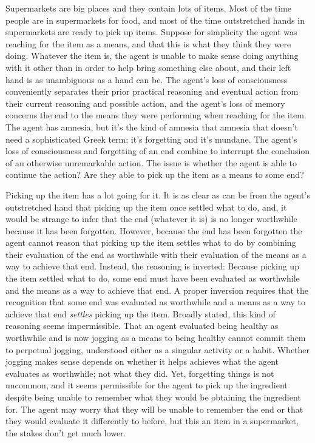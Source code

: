 \documentclass[10pt]{article}
\newcommand{\hozlinedash}[0]{%
  \noindent\hdashrule[0.5ex][c]{\textwidth}{.1pt}{2.5pt}
}
\begin{document}
\hozlinedash

Supermarkets are big places and they contain lots of items.
Most of the time people are in supermarkets for food, and most of the time outstretched hands in supermarkets are ready to pick up items.
Suppose for simplicity the agent was reaching for the item as a means, and that this is what they think they were doing.
Whatever the item is, the agent is unable to make sense doing anything with it other than in order to help bring something else about, and their left hand is as unambiguous as a hand can be.
The agent's loss of consciousness conveniently separates their prior practical reasoning and eventual action from their current reasoning and possible action, and the agent's loss of memory concerns the end to the means they were performing when reaching for the item.
The agent has amnesia, but it's the kind of amnesia that amnesia that doesn't need a sophisticated Greek term; it's forgetting and it's mundane.
The agent's loss of consciousness and forgetting of an end combine to interrupt the conclusion of an otherwise unremarkable action.
The issue is whether the agent is able to continue the action?
Are they able to pick up the item as a means to some end?

Picking up the item has a lot going for it.
It is as clear as can be from the agent's outstretched hand that picking up the item once settled what to do, and, it would be strange to infer that the end (whatever it is) is no longer worthwhile because it has been forgotten.
However, because the end has been forgotten the agent cannot reason that picking up the item settles what to do by combining their evaluation of the end as worthwhile with their evaluation of the means as a way to achieve that end.
Instead, the reasoning is inverted:
Because picking up the item settled what to do, some end must have been evaluated as worthwhile and the means as a way to achieve that end.
A proper inversion requires that the recognition that some end was evaluated as worthwhile and a means as a way to achieve that end \emph{settles} picking up the item.
Broadly stated, this kind of reasoning seems impermissible.
That an agent evaluated being healthy as worthwhile and is now jogging as a means to being healthy cannot commit them to perpetual jogging, understood either as a singular activity or a habit.
Whether jogging makes sense depends on whether it helps achieves what the agent evaluates as worthwhile; not what they did.
Yet, forgetting things is not uncommon, and it seems permissible for the agent to pick up the ingredient despite being unable to remember what they would be obtaining the ingredient for.
The agent may worry that they will be unable to remember the end or that they would evaluate it differently to before, but this an item in a supermarket, the stakes don't get much lower.
\end{document}
